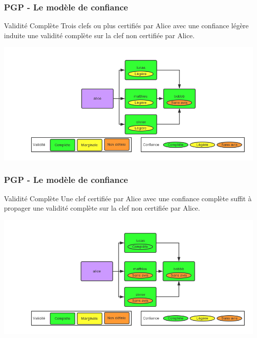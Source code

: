 \begin{frame}
  \frametitle{\color{white}PGP - Le modèle de confiance}
    \begin{block}{Validité Complète}
      Trois clefs ou plus certifiés par Alice avec une confiance légère
      induite une validité complète sur la clef non certifiée par Alice.
    \end{block}
    \includegraphics[scale=0.3]{tdcdemoComplete1.png}
\end{frame}
\begin{frame}
  \frametitle{\color{white}PGP - Le modèle de confiance}
    \begin{block}{Validité Complète}
      Une clef certifiée par Alice avec une confiance complète
      suffit à propager une validité complète sur la clef non certifiée par Alice.
    \end{block}
    \includegraphics[scale=0.3]{tdcdemoComplete2.png}
\end{frame}

